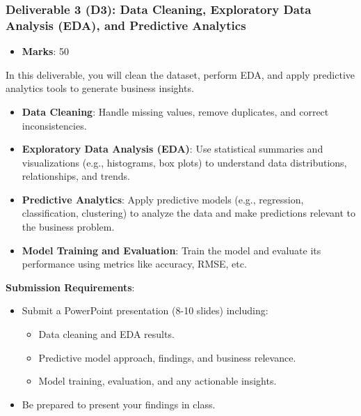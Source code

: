 \documentclass[
]{article}
\providecommand{\tightlist}{%
  \setlength{\itemsep}{0pt}\setlength{\parskip}{0pt}}
\begin{document}
\subsubsection{\texorpdfstring{\textbf{Deliverable 3 (D3): Data
Cleaning, Exploratory Data Analysis (EDA), and Predictive
Analytics}}{Deliverable 3 (D3): Data Cleaning, Exploratory Data Analysis (EDA), and Predictive Analytics}}\label{deliverable-3-d3-data-cleaning-exploratory-data-analysis-eda-and-predictive-analytics}

\begin{itemize}
\tightlist
\item
  \textbf{Marks}: 50
\end{itemize}

In this deliverable, you will clean the dataset, perform EDA, and apply
predictive analytics tools to generate business insights.

\begin{itemize}
\tightlist
\item
  \textbf{Data Cleaning}: Handle missing values, remove duplicates, and
  correct inconsistencies.
\item
  \textbf{Exploratory Data Analysis (EDA)}: Use statistical summaries
  and visualizations (e.g., histograms, box plots) to understand data
  distributions, relationships, and trends.
\item
  \textbf{Predictive Analytics}: Apply predictive models (e.g.,
  regression, classification, clustering) to analyze the data and make
  predictions relevant to the business problem.
\item
  \textbf{Model Training and Evaluation}: Train the model and evaluate
  its performance using metrics like accuracy, RMSE, etc.
\end{itemize}

\textbf{Submission Requirements}:

\begin{itemize}
\tightlist
\item
  Submit a PowerPoint presentation (8-10 slides) including:

  \begin{itemize}
  \tightlist
  \item
    Data cleaning and EDA results.
  \item
    Predictive model approach, findings, and business relevance.
  \item
    Model training, evaluation, and any actionable insights.
  \end{itemize}
\item
  Be prepared to present your findings in class.
\end{itemize}
\end{document}
